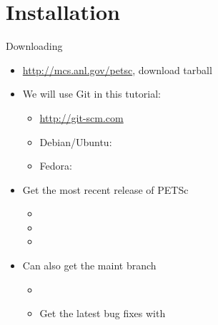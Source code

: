 \section{Installation}
\begin{frame}{Downloading}
\begin{itemize}
  \item \url{http://mcs.anl.gov/petsc}, download tarball
  \item We will use Git in this tutorial:
  \begin{itemize}
    \item \url{http://git-scm.com}
    \item Debian/Ubuntu: 
    \item Fedora: 
  \end{itemize}
  \item Get the most recent release of PETSc
  \begin{itemize}\footnotesize
    \item {}
    \item {}
    \item {}
  \end{itemize}
  \item Can also get the maint branch
  \begin{itemize}
    \item {}
    \item Get the latest bug fixes with 
  \end{itemize}
\end{itemize}
\end{frame}

